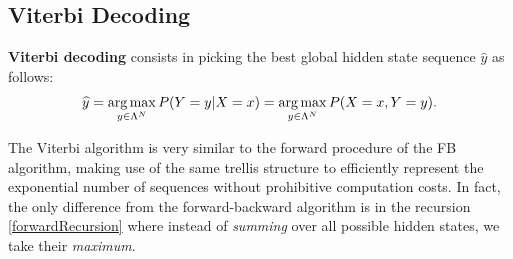 
%


\subsection{Viterbi Decoding}\label{viterbi}


\textbf{Viterbi decoding} consists in
picking the best global hidden state sequence 
$\widehat{y}$
as follows: 
\begin{equation}
\widehat{y} = \operatorname*{arg\,max}_{y \in \Lambda^N} P(Y=y|X=x) = \operatorname*{arg\,max}_{y \in \Lambda^N} P(X=x,Y=y).
\end{equation}

The Viterbi algorithm 
is very similar to the forward procedure of the FB algorithm,
making use of the same trellis structure to efficiently represent the exponential number of sequences without prohibitive computation costs. In fact, the only
difference from the forward-backward algorithm is in the recursion
\ref{forwardRecursion} where instead of \emph{summing} over all possible 
hidden states, we take their \emph{maximum}.

